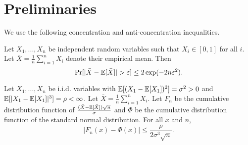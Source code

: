 \section{Preliminaries}
\label{sec:prelim}

We use the following  concentration and anti-concentration inequalities.
\begin{theorem}
Let $X_1,...,X_n$  be independent random variables such that $X_i \in [0,1]$ for all $i$. Let $\bar{X} = \frac{1}{n}\sum_{i=1}^n X_i$ denote their empirical mean. Then
\[
\Pr[ |\bar{X} - \mathbb{E}[\bar{X}]| > \varepsilon] \leq 2\exp(-2n\varepsilon^2).
\]
\end{theorem}

\begin{theorem}
Let $X_1,...,X_n$ be i.i.d. variables with $\mathbb{E}[ (X_1 - \mathbb{E}[X_1])^2] = \sigma^2 >0$ and $\mathbb{E}[ |X_1 - \mathbb{E}[X_1]|^3] =\rho <\infty$. Let $\bar{X} = \frac{1}{n} \sum_{i=1}^n X_i$. Let $F_n$ be the cumulative distribution function of $\frac{(\bar{X} - \mathbb{E}[\bar{X}]) \sqrt{n}}{\sigma}$ and $\Phi$ be the cumulative distribution function of the standard normal distribution. For all $x$ and $n$,
\[
|F_n(x) - \Phi(x) | \leq \frac{\rho}{2\sigma^3\sqrt{n}}.
\]
\end{theorem}

